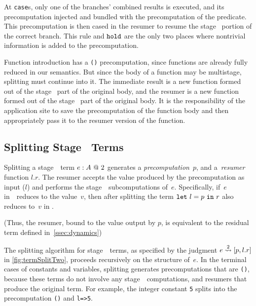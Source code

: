 At {\tt case}s, only one of the branches' combined results is executed, and its precomputation injected and bundled with the precomputation of the predicate. 
This precomputation is then cased in the resumer to resume the stage \bbtwo\ portion of the correct branch.
This rule and ${\tt hold}$ are the only two places where nontrivial information is added to the precomputation.

Function introduction has a \texttt{()} precomputation, since functions are already fully reduced in our semantics.
But since the body of a function may be multistage, splitting must continue into it.
The immediate result is a new function formed out of the stage \bbone\ part of the original body,
and the resumer is a new function formed out of the stage \bbtwo\ part of the original body.
It is the responsibility of the application site to save the precomputation of the function body
and then appropriately pass it to the resumer version of the function.

\subsection{Splitting Stage \bbtwo\ Terms}

Splitting a stage~\bbtwo\ term ${e}:{A}~@~ 2$ generates a
\emph{precomputation}~$p$, and a~\emph{resumer} function $l.r$.  The
resumer accepts the value produced by the precomputation as input
($l$) and performs the stage~\bbtwo\ subcomputations of~$e$.
Specifically, if~$e$ in~\lang\ reduces to the value~$v$, then after
splitting the term ${\tt let}~{l} = {p}~{\tt in}~{r}$ also reduces to~$v$ in \langmono.

(Thus, the resumer, bound to the value output by $p$, is equivalent to
the residual term defined in~\ref{ssec:dynamics})




The splitting algorithm for stage~\bbtwo\ terms, as specified by the
judgment $e \overset{ 2}\rightsquigarrow [p,l.r]$ in \cref{fig:termSplitTwo}, proceeds
recursively on the structure of~$e$.  In the terminal cases of
constants and variables, splitting generates precomputations that are
\texttt{()}, because these terms do not involve any stage~\bbone\
computations, and resumers that produce the original term. For
example, the integer constant \texttt{5} splits into the
precomputation \texttt{()} and \texttt{l=>5}.

